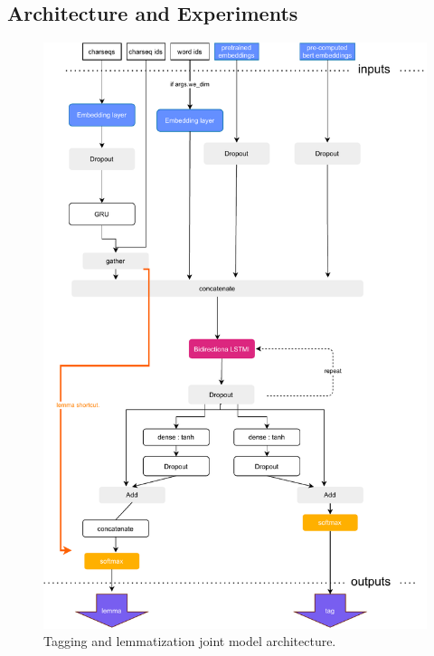 \subsection{Architecture and Experiments}

\begin{figure}[!h]
\centering
\includegraphics[width=1\columnwidth]{../img/taggermodel.pdf}
\protect\caption{Tagging and lemmatization joint model architecture.}
\label{pic:lt_arch}
\end{figure}


